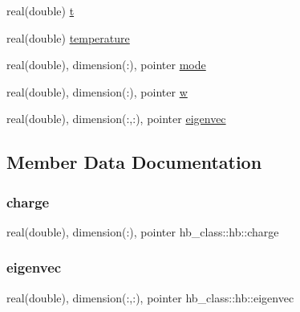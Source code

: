 \begin{DoxyCompactItemize}
\item 
real(double) \hyperlink{structhb__class_1_1hb_aa9a64f5f6e1c6b43e49f4f369cc36122}{t}
\item 
real(double) \hyperlink{structhb__class_1_1hb_a5d5e5ee121dffd96571df21b84b83507}{temperature}
\item 
real(double), dimension(\+:), pointer \hyperlink{structhb__class_1_1hb_ac5b121a046f5ee32acc9830d4a9d0583}{mode}
\item 
real(double), dimension(\+:), pointer \hyperlink{structhb__class_1_1hb_aa5b032073db26bbc82430e5dcefa77a6}{w}
\item 
real(double), dimension(\+:,\+:), pointer \hyperlink{structhb__class_1_1hb_ac62b62b36a6c37ba8477efc35c6f97bf}{eigenvec}
\end{DoxyCompactItemize}


\subsection{Member Data Documentation}
\mbox{\label{structhb__class_1_1hb_ae5d949ad83b1c2491acca3fedb59127f}} 
\subsubsection{\texorpdfstring{charge}{charge}}
{\footnotesize\ttfamily real(double), dimension(\+:), pointer hb\+\_\+class\+::hb\+::charge\hspace{0.3cm}{\ttfamily [private]}}

\mbox{\label{structhb__class_1_1hb_ac62b62b36a6c37ba8477efc35c6f97bf}} 
\subsubsection{\texorpdfstring{eigenvec}{eigenvec}}
{\footnotesize\ttfamily real(double), dimension(\+:,\+:), pointer hb\+\_\+class\+::hb\+::eigenvec\hspace{0.3cm}{\ttfamily [private]}}

\mbox{\label{structhb__class_1_1hb_af871a155778593b68d1a0b12f20a9296}} 
